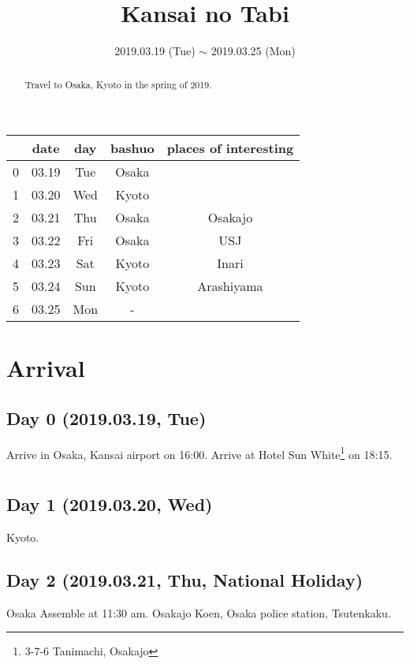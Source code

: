\documentclass{article}
\title{Kansai no Tabi}
\date{2019.03.19 (Tue) $\sim$ 2019.03.25 (Mon)}
\begin{document}
\maketitle

\begin{abstract}
Travel to Osaka, Kyoto in the spring of 2019.
\end{abstract}

\begin{tabular}{ c | c | c | c | c }
  & date   & day  & bashuo & places of interesting \\\hline
0 & 03.19  & Tue  & Osaka & \\
1 & 03.20  & Wed  & Kyoto & \\
2 & 03.21  & Thu  & Osaka & Osakajo \\
3 & 03.22  & Fri  & Osaka & USJ \\
4 & 03.23  & Sat  & Kyoto & Inari \\
5 & 03.24  & Sun  & Kyoto & Arashiyama \\
6 & 03.25  & Mon  & - & \\
\end{tabular}


\section{Arrival}
\subsection{Day 0 (2019.03.19, Tue)}
Arrive in Osaka, Kansai airport on 16:00.
Arrive at Hotel Sun White\footnote{3-7-6 Tanimachi, Osakajo} on 18:15.

\section{}
\subsection{Day 1 (2019.03.20, Wed)}
Kyoto.

\subsection{Day 2 (2019.03.21, Thu, National Holiday)}
Osaka
Assemble at 11:30 am.
Osakajo Koen, Osaka police station, Tsutenkaku.
\end{document}
